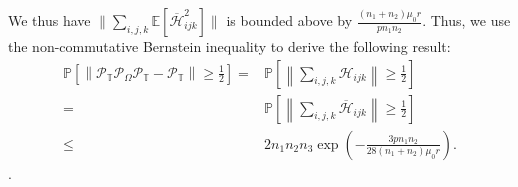 \documentclass[twoside,12pt]{article}
\begin{document}
We thus have $\|\sum\limits_{i, j, k} \mathbb{E}\left[\overline{\mathcal{H}}_{i j k}^2\right]\|$ is bounded above by $\frac{(n_1+n_2)\mu_{0}r}{pn_{1}n_{2}}$.
Thus, we use the non-commutative Bernstein inequality to derive the following result: 
\begin{align*}
\mathbb{P}\left[\left\|\mathcal{P}_{\mathbb{T}} \mathcal{P}_{\Omega} \mathcal{P}_{\mathbb{T}}-\mathcal{P}_{\mathbb{T}}\right\|\geq\frac{1}{2}\right] 
= &  \mathbb{P}\left[\left\|\sum\limits_{i,j,k} \mathcal{H}_{i j k}\right\|\geq \frac{1}{2}\right] \\
= & \mathbb{P}\left[\left\|\sum\limits_{i,j,k} \overline{\mathcal{{H}}}_{i j k}\right\|
\geq \frac 1 2\right] \\
\leq&   2n_1n_2n_3  \exp\left(-\frac{3pn_1n_2}{28(n_1+n_2)\mu_0 r}\right).
\end{align*}.
\hfill\BlackBox
\end{document}
